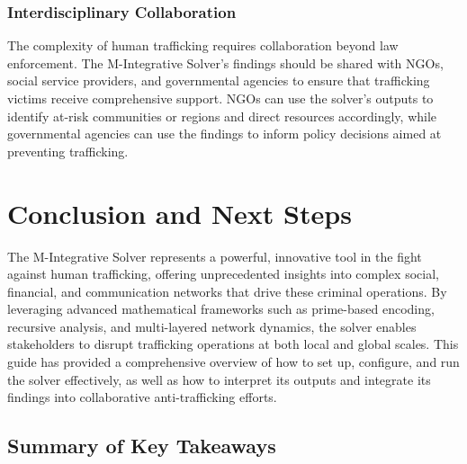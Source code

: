 \documentclass[%
 preprint, linenumbers,
 amsmath,amssymb,
 aps, physrev,
]{revtex4-2}
\begin{document}
\subsubsection{Interdisciplinary Collaboration}

The complexity of human trafficking requires collaboration beyond law enforcement. The M-Integrative Solver’s findings should be shared with NGOs, social service providers, and governmental agencies to ensure that trafficking victims receive comprehensive support. NGOs can use the solver’s outputs to identify at-risk communities or regions and direct resources accordingly, while governmental agencies can use the findings to inform policy decisions aimed at preventing trafficking.
\section{Conclusion and Next Steps}

The M-Integrative Solver represents a powerful, innovative tool in the fight against human trafficking, offering unprecedented insights into complex social, financial, and communication networks that drive these criminal operations. By leveraging advanced mathematical frameworks such as prime-based encoding, recursive analysis, and multi-layered network dynamics, the solver enables stakeholders to disrupt trafficking operations at both local and global scales. This guide has provided a comprehensive overview of how to set up, configure, and run the solver effectively, as well as how to interpret its outputs and integrate its findings into collaborative anti-trafficking efforts.

\subsection{Summary of Key Takeaways}
\end{document}
